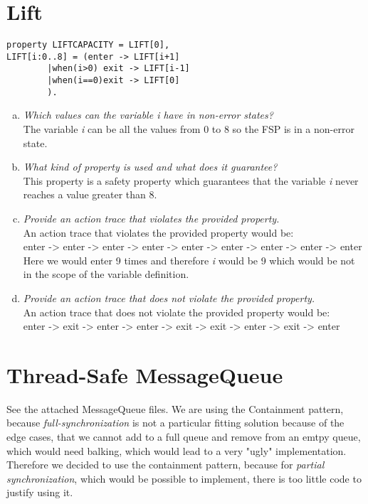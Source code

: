 \documentclass{report}
\begin{document}
	\section{Lift}
	\startsection
		\begin{verbatim}
property LIFTCAPACITY = LIFT[0],
LIFT[i:0..8] = (enter -> LIFT[i+1]
		|when(i>0) exit -> LIFT[i-1]
		|when(i==0)exit -> LIFT[0]
		).
		\end{verbatim}
		\begin{enumerate}[a)]
			\item \textit{Which values can the variable i have in non-error states?} \\
			The variable \textit{i} can be all the values from 0 to 8 so the FSP is in a non-error state.
			\item \textit{What kind of property is used and what does it guarantee?} \\
			This property is a safety property which guarantees that the variable \textit{i} never reaches a value greater than 8.
			\item \textit{Provide an action trace that violates the provided property.} \\
			An action trace that violates the provided property would be: \\
			enter -> enter -> enter -> enter -> enter -> enter -> enter -> enter -> enter \\
			Here we would enter 9 times and therefore \textit{i} would be 9 which would be not in the scope of the variable definition.
			\item \textit{Provide an action trace that does not violate the provided property.} \\
			An action trace that does not violate the provided property would be: \\
			enter -> exit -> enter -> enter -> exit -> exit -> enter -> exit -> enter \\
		\end{enumerate}
	\closesection
	
	\section{Thread-Safe MessageQueue}
	\startsection
		See the attached MessageQueue files. We are using the Containment pattern, because \textit{full-synchronization} is not a particular fitting solution because of the edge cases, that we cannot add to a full queue and remove from an emtpy queue, which would need balking, which would lead to a very "ugly" implementation. Therefore we decided to use the containment pattern, because for \textit{partial synchronization}, which would be possible to implement, there is too little code to justify using it.
	\closesection
\end{document}
